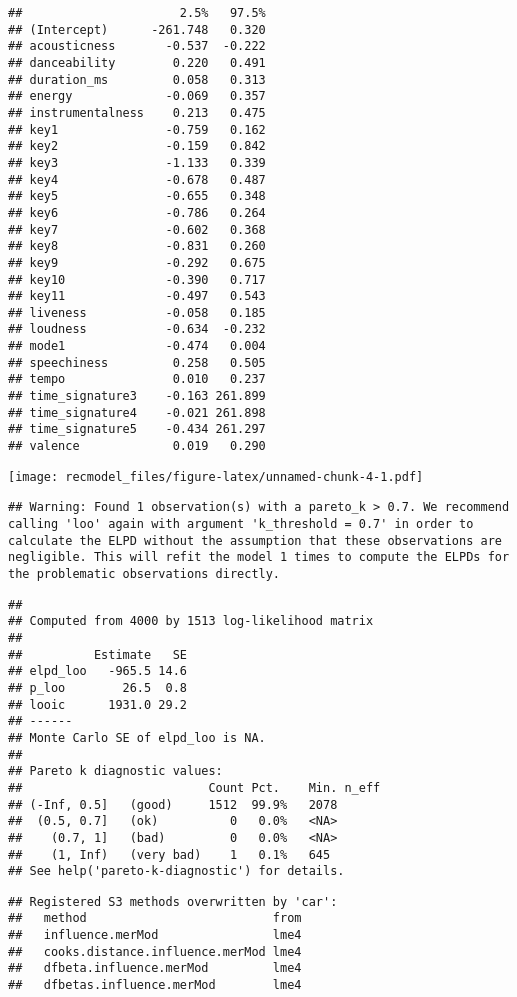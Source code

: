 \documentclass[
]{article}
\begin{document}
\begin{verbatim}
##                      2.5%   97.5%
## (Intercept)      -261.748   0.320
## acousticness       -0.537  -0.222
## danceability        0.220   0.491
## duration_ms         0.058   0.313
## energy             -0.069   0.357
## instrumentalness    0.213   0.475
## key1               -0.759   0.162
## key2               -0.159   0.842
## key3               -1.133   0.339
## key4               -0.678   0.487
## key5               -0.655   0.348
## key6               -0.786   0.264
## key7               -0.602   0.368
## key8               -0.831   0.260
## key9               -0.292   0.675
## key10              -0.390   0.717
## key11              -0.497   0.543
## liveness           -0.058   0.185
## loudness           -0.634  -0.232
## mode1              -0.474   0.004
## speechiness         0.258   0.505
## tempo               0.010   0.237
## time_signature3    -0.163 261.899
## time_signature4    -0.021 261.898
## time_signature5    -0.434 261.297
## valence             0.019   0.290
\end{verbatim}

\texttt{[image: recmodel\_files/figure-latex/unnamed-chunk-4-1.pdf]}

\begin{verbatim}
## Warning: Found 1 observation(s) with a pareto_k > 0.7. We recommend calling 'loo' again with argument 'k_threshold = 0.7' in order to calculate the ELPD without the assumption that these observations are negligible. This will refit the model 1 times to compute the ELPDs for the problematic observations directly.
\end{verbatim}

\begin{verbatim}
## 
## Computed from 4000 by 1513 log-likelihood matrix
## 
##          Estimate   SE
## elpd_loo   -965.5 14.6
## p_loo        26.5  0.8
## looic      1931.0 29.2
## ------
## Monte Carlo SE of elpd_loo is NA.
## 
## Pareto k diagnostic values:
##                          Count Pct.    Min. n_eff
## (-Inf, 0.5]   (good)     1512  99.9%   2078      
##  (0.5, 0.7]   (ok)          0   0.0%   <NA>      
##    (0.7, 1]   (bad)         0   0.0%   <NA>      
##    (1, Inf)   (very bad)    1   0.1%   645       
## See help('pareto-k-diagnostic') for details.
\end{verbatim}

\begin{verbatim}
## Registered S3 methods overwritten by 'car':
##   method                          from
##   influence.merMod                lme4
##   cooks.distance.influence.merMod lme4
##   dfbeta.influence.merMod         lme4
##   dfbetas.influence.merMod        lme4
\end{verbatim}
\end{document}
